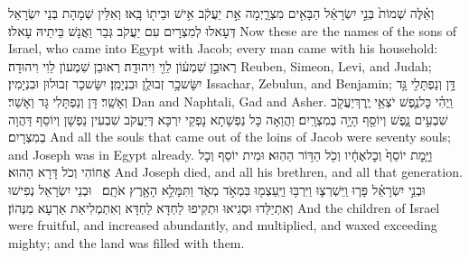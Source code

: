 {וְאֵ֗לֶּה שְׁמוֹת֙ בְּנֵ֣י יִשְׂרָאֵ֔ל הַבָּאִ֖ים מִצְרָ֑יְמָה אֵ֣ת יַעֲקֹ֔ב אִ֥ישׁ וּבֵית֖וֹ בָּֽאוּ׃}
{וְאִלֵּין שְׁמָהָת בְּנֵי יִשְׂרָאֵל דְּעָאלוּ לְמִצְרָיִם עִם יַעֲקֹב גְּבַר וַאֲנָשׁ בֵּיתֵיהּ עָאלוּ׃}
{Now these are the names of the sons of Israel, who came into Egypt with Jacob; every man came with his household:}{}
{רְאוּבֵ֣ן שִׁמְע֔וֹן לֵוִ֖י וִיהוּדָֽה׃}
{רְאוּבֵן שִׁמְעוֹן לֵוִי וִיהוּדָה׃}
{Reuben, Simeon, Levi, and Judah;}{}
{יִשָּׂשכָ֥ר זְבוּלֻ֖ן וּבִנְיָמִֽן׃}
{יִשָּׂשכָר זְבוּלוּן וּבִנְיָמִין׃}
{Issachar, Zebulun, and Benjamin;}{}
{דָּ֥ן וְנַפְתָּלִ֖י גָּ֥ד וְאָשֵֽׁר׃}
{דָּן וְנַפְתָּלִי גָּד וְאָשֵׁר׃}
{Dan and Naphtali, Gad and Asher.}{}
{וַֽיְהִ֗י כׇּל\maqqaf נֶ֛פֶשׁ יֹצְאֵ֥י יֶֽרֶךְ\maqqaf יַעֲקֹ֖ב שִׁבְעִ֣ים נָ֑פֶשׁ וְיוֹסֵ֖ף הָיָ֥ה בְמִצְרָֽיִם׃}
{וַהֲוַאָה כָּל נַפְשָׁתָא נָפְקֵי יִרְכָּא דְּיַעֲקֹב שִׁבְעִין נַפְשָׁן וְיוֹסֵף דַּהֲוָה בְמִצְרָיִם׃}
{And all the souls that came out of the loins of Jacob were seventy souls; and Joseph was in Egypt already.}{}
{וַיָּ֤מׇת יוֹסֵף֙ וְכׇל\maqqaf אֶחָ֔יו וְכֹ֖ל הַדּ֥וֹר הַהֽוּא׃}
{וּמִית יוֹסֵף וְכָל אֲחוֹהִי וְכֹל דָּרָא הַהוּא׃}
{And Joseph died, and all his brethren, and all that generation.}{}
{וּבְנֵ֣י יִשְׂרָאֵ֗ל פָּר֧וּ וַֽיִּשְׁרְצ֛וּ וַיִּרְבּ֥וּ וַיַּֽעַצְמ֖וּ בִּמְאֹ֣ד מְאֹ֑ד וַתִּמָּלֵ֥א הָאָ֖רֶץ אֹתָֽם׃ \petucha }
{וּבְנֵי יִשְׂרָאֵל נְפִישׁוּ וְאִתְיַלַּדוּ וּסְגִיאוּ וּתְקִיפוּ לַחְדָּא לַחְדָּא וְאִתְמְלִיאַת אַרְעָא מִנְּהוֹן׃}
{And the children of Israel were fruitful, and increased abundantly, and multiplied, and waxed exceeding mighty; and the land was filled with them.}{}
